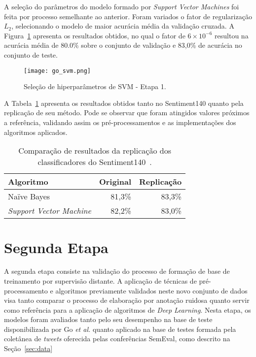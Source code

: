 A seleção do parâmetros do modelo formado por \textit{Support Vector Machines} foi feita por processo semelhante ao
anterior.
Foram variados o fator de regularização $L_{2}$, selecionando o modelo de maior acurácia média da validação cruzada.
A Figura~\ref{fig:go_svm} apresenta os resultados obtidos, no qual o fator de $6 \times 10^{-6}$ resultou na acurácia
média de 80.0\% sobre o conjunto de validação e 83,0\% de acurácia no conjunto de teste.

\begin{figure}
\begin{center} {
    \begin{center}
    \texttt{[image: go\_svm.png]}
    \caption{Seleção de hiperparâmetros de SVM - Etapa 1.}
    \label{fig:go_svm}
    \end{center}
}
\end{center}
\end{figure}

A Tabela~\ref{tab:go_compara} apresenta os resultados obtidos tanto no Sentiment140 quanto pela replicação de
seu método.
Pode se observar que foram atingidos valores próximos a referência, validando assim os pré-processamentos e as
implementações dos algoritmos aplicados.

\begin{table}[h]
    \begin{center}
        \begin{tabular}{| l | r | r |}
        \hline
        \textbf{Algoritmo} & \textbf{Original} & \textbf{Replicação} \\ \hline
        Naïve Bayes & 81,3\% & 83,3\% \\ \hline
        \textit{Support Vector Machine} &  82,2\% & 83,0\% \\ \hline
        \end{tabular}
        \caption{Comparação de resultados da replicação dos classificadores do Sentiment140~\cite{go09}.}
        \label{tab:go_compara}
    \end{center}
\end{table}

\section{Segunda Etapa}

A segunda etapa consiste na validação do processo de formação de base de treinamento por supervisão distante.
A aplicação de técnicas de pré-processamento e algoritmos previamente validados neste novo conjunto de dados visa tanto
comparar o processo de elaboração por anotação ruidosa quanto servir como referência para a aplicação de algoritmos de
\textit{Deep Learning}.
Nesta etapa, os modelos foram avaliados tanto pelo seu desempenho na base de teste disponibilizada por Go
\textit{et al.} quanto aplicado na base de testes formada pela coletânea de \textit{tweets} oferecida pelas conferências
SemEval, como descrito na Seção~\ref{sec:data}

